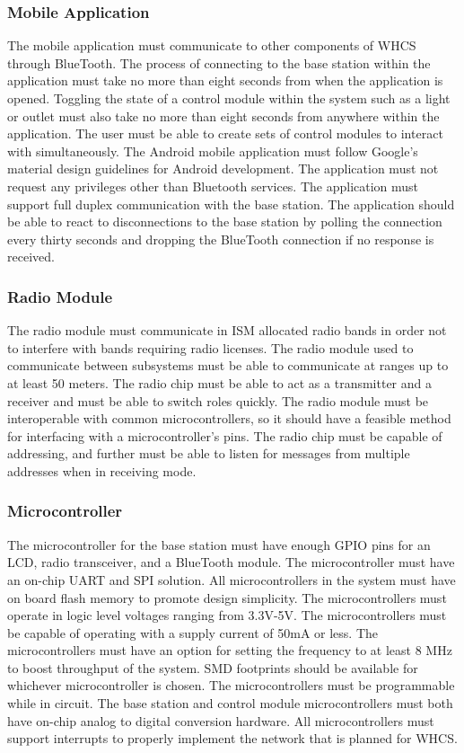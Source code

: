 \subsubsection{Mobile Application}

The mobile application must communicate to other components of WHCS through
BlueTooth. The process of connecting to the base station within the application
must take no more than eight seconds from when the application is opened.
Toggling the state of a control module within the system such as a light or
outlet must also take no more than eight seconds from anywhere within the
application. The user must be able to create sets of control modules to
interact with simultaneously. The Android mobile application must follow
Google{}'s material design guidelines for Android development. The application
must not request any privileges other than Bluetooth services. The application
must support full duplex communication with the base station. The application
should be able to react to disconnections to the base station by polling the
connection every thirty seconds and dropping the BlueTooth connection if no
response is received.

\subsubsection{Radio Module}

The radio module must communicate in ISM allocated radio bands in order not to
interfere with bands requiring radio licenses. The radio module used to
communicate between subsystems must be able to communicate at ranges up to at
least 50 meters. The radio chip must be able to act as a transmitter and a
receiver and must be able to switch roles quickly.  The radio module must be
interoperable with common microcontrollers, so it should have a feasible method
for interfacing with a microcontroller{}'s pins. The radio chip must be capable
of addressing, and further must be able to listen for messages from multiple
addresses when in receiving mode.

\subsubsection{Microcontroller}

The microcontroller for the base station must have enough GPIO pins for an LCD,
radio transceiver, and a BlueTooth module. The microcontroller must have an
on{}-chip UART and SPI solution. All microcontrollers in the system must have
on board flash memory to promote design simplicity. The microcontrollers must
operate in logic level voltages ranging from 3.3V{}-5V. The microcontrollers
must be capable of operating with a supply current of 50mA or less. The
microcontrollers must have an option for setting the frequency to at least 8
MHz to boost throughput of the system. SMD footprints should be available for
whichever microcontroller is chosen. The microcontrollers must be programmable
while in circuit. The base station and control module microcontrollers must
both have on{}-chip analog to digital conversion hardware. All microcontrollers
must support interrupts to properly implement the network that is planned for
WHCS.

